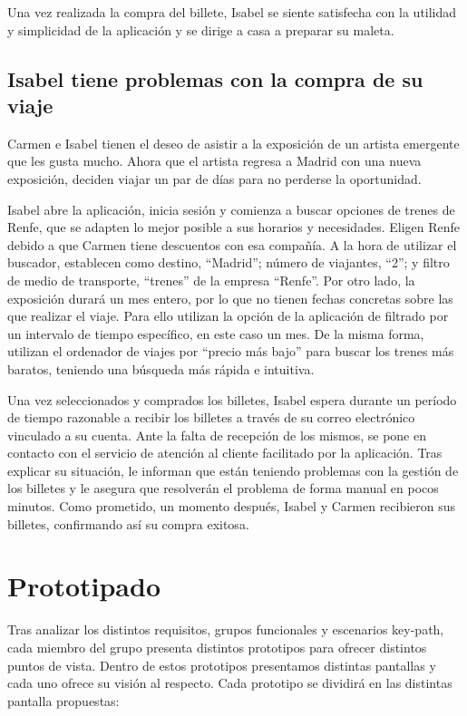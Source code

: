 Una vez realizada la compra del billete, Isabel se siente satisfecha con la
utilidad y simplicidad de la aplicación y se dirige a casa a preparar su
maleta.

\subsection{Isabel tiene problemas con la compra de su viaje}

Carmen e Isabel tienen el deseo de asistir a la exposición de un artista
emergente que les gusta mucho. Ahora que el artista regresa a Madrid con una
nueva exposición, deciden viajar un par de días para no perderse la
oportunidad.

Isabel abre la aplicación, inicia sesión y comienza a buscar opciones de trenes
de Renfe, que se adapten lo mejor posible a sus horarios y necesidades. Eligen
Renfe debido a que Carmen tiene descuentos con esa compañía. A la hora de
utilizar el buscador, establecen como destino, “Madrid”; número de viajantes,
“2”; y filtro de medio de transporte, “trenes” de la empresa “Renfe”. Por otro
lado, la exposición durará un mes entero, por lo que no tienen fechas concretas
sobre las que realizar el viaje. Para ello utilizan la opción de la aplicación
de filtrado por un intervalo de tiempo específico, en este caso un mes. De la
misma forma, utilizan el ordenador de viajes por “precio más bajo” para buscar
los trenes más baratos, teniendo una búsqueda más rápida e intuitiva.

Una vez seleccionados y comprados los billetes, Isabel espera durante un
período de tiempo razonable a recibir los billetes a través de su correo
electrónico vinculado a su cuenta. Ante la falta de recepción de los mismos, se
pone en contacto con el servicio de atención al cliente facilitado por la
aplicación. Tras explicar su situación, le informan que están teniendo
problemas con la gestión de los billetes y le asegura que resolverán el
problema de forma manual en pocos minutos. Como prometido, un momento después,
Isabel y Carmen recibieron sus billetes, confirmando así su compra exitosa.

\section{Prototipado}

Tras analizar los distintos requisitos, grupos funcionales y escenarios
key-path, cada miembro del grupo presenta distintos prototipos para ofrecer
distintos puntos de vista. Dentro de estos prototipos presentamos distintas
pantallas y cada uno ofrece su visión al respecto. Cada prototipo se dividirá
en las distintas pantalla propuestas:

